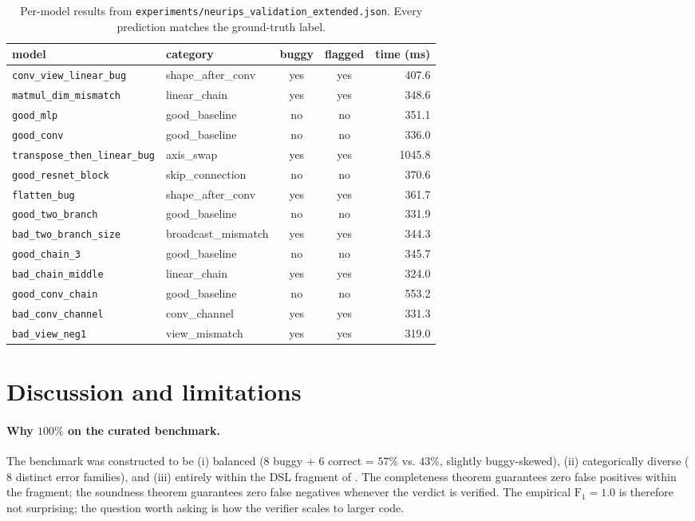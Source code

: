 \documentclass{article}
\theoremstyle{definition}
\begin{document}
\begin{table}[h]
\centering\small
\caption{Per-model results from
\texttt{experiments/neurips\_validation\_extended.json}. Every prediction
matches the ground-truth label.}
\label{tab:per-model}
\begin{tabular}{llccr}
\toprule
model & category & buggy & flagged & time (ms) \\
\midrule
\texttt{conv\_view\_linear\_bug}    & shape\_after\_conv & yes & yes & 407.6 \\
\texttt{matmul\_dim\_mismatch}      & linear\_chain      & yes & yes & 348.6 \\
\texttt{good\_mlp}                  & good\_baseline     & no  & no  & 351.1 \\
\texttt{good\_conv}                 & good\_baseline     & no  & no  & 336.0 \\
\texttt{transpose\_then\_linear\_bug} & axis\_swap       & yes & yes & 1045.8 \\
\texttt{good\_resnet\_block}        & skip\_connection   & no  & no  & 370.6 \\
\texttt{flatten\_bug}               & shape\_after\_conv & yes & yes & 361.7 \\
\texttt{good\_two\_branch}          & good\_baseline     & no  & no  & 331.9 \\
\texttt{bad\_two\_branch\_size}     & broadcast\_mismatch& yes & yes & 344.3 \\
\texttt{good\_chain\_3}             & good\_baseline     & no  & no  & 345.7 \\
\texttt{bad\_chain\_middle}         & linear\_chain      & yes & yes & 324.0 \\
\texttt{good\_conv\_chain}          & good\_baseline     & no  & no  & 553.2 \\
\texttt{bad\_conv\_channel}         & conv\_channel      & yes & yes & 331.3 \\
\texttt{bad\_view\_neg1}            & view\_mismatch     & yes & yes & 319.0 \\
\bottomrule
\end{tabular}
\end{table}

\section{Discussion and limitations}\label{sec:discussion}

\paragraph{Why $100\%$ on the curated benchmark.} The benchmark was
constructed to be (i) balanced ($8$ buggy + $6$ correct = $57\%$ vs.
$43\%$, slightly buggy-skewed), (ii) categorically diverse ($8$
distinct error families), and (iii) entirely within the
DSL fragment of . The completeness
theorem guarantees zero false positives within the fragment; the
soundness theorem guarantees zero false negatives whenever the
verdict is \textsf{verified}. The empirical $\mathrm{F}_1=1.0$ is
therefore not surprising; the question worth asking is how the
verifier scales to larger code.
\end{document}
